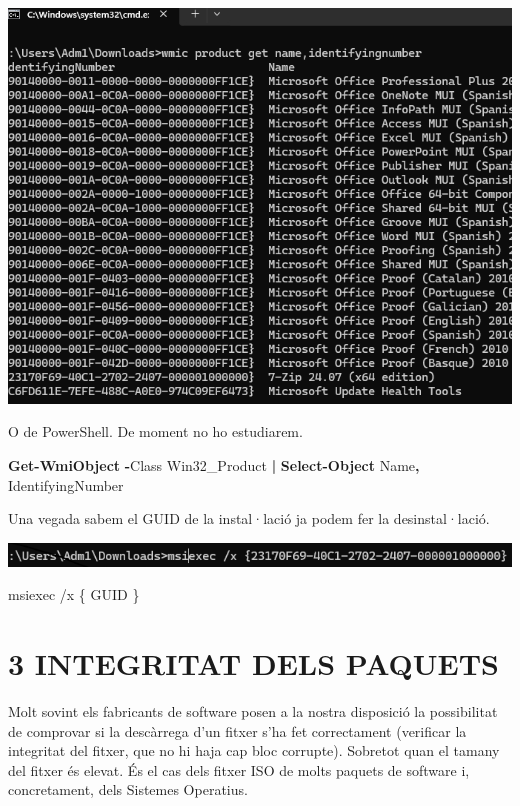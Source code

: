 \documentclass[
  a4paper,
]{article}
\newenvironment{Shaded}{\begin{snugshade}}{\end{snugshade}}
\newcommand{\AttributeTok}[1]{\textcolor[rgb]{0.13,0.29,0.53}{#1}}
\newcommand{\FunctionTok}[1]{\textcolor[rgb]{0.13,0.29,0.53}{\textbf{#1}}}
\newcommand{\NormalTok}[1]{#1}
\newcommand{\OperatorTok}[1]{\textcolor[rgb]{0.81,0.36,0.00}{\textbf{#1}}}
\begin{document}
\includegraphics{png/desinstalarMSI1.png}

O de PowerShell. De moment no ho estudiarem.

\begin{Shaded}
\begin{Highlighting}[]
\FunctionTok{Get{-}WmiObject} \OperatorTok{{-}}\NormalTok{Class Win32\_Product }\OperatorTok{|} \FunctionTok{Select{-}Object}\NormalTok{ Name}\OperatorTok{,}\NormalTok{ IdentifyingNumber}
\end{Highlighting}
\end{Shaded}

Una vegada sabem el GUID de la instal·lació ja podem fer la
desinstal·lació.

\includegraphics{png/desinstalarMSI2.png}

\begin{Shaded}
\begin{Highlighting}[]
\NormalTok{msiexec }\AttributeTok{/x}\NormalTok{ \{ GUID \}}
\end{Highlighting}
\end{Shaded}

\section{3 INTEGRITAT DELS PAQUETS}\label{integritat-dels-paquets}

Molt sovint els fabricants de software posen a la nostra disposició la
possibilitat de comprovar si la descàrrega d'un fitxer s'ha fet
correctament (verificar la integritat del fitxer, que no hi haja cap
bloc corrupte). Sobretot quan el tamany del fitxer és elevat. És el cas
dels fitxer ISO de molts paquets de software i, concretament, dels
Sistemes Operatius.
\end{document}
